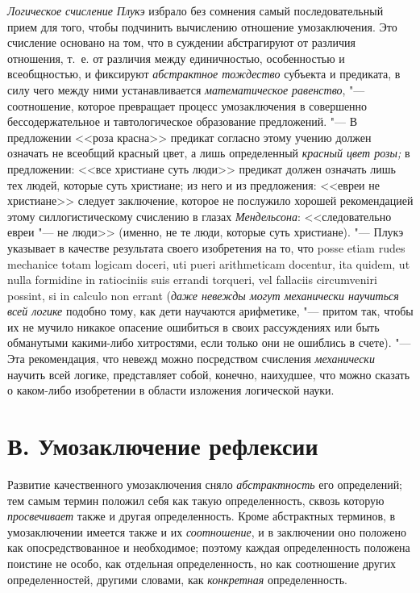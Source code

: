 {\em Логическое счисление Плукэ}
избрало без сомнения самый последовательный прием для того,
чтобы подчинить вычислению отношение умозаключения. Это счисление основано
на том, что в суждении абстрагируют от различия отношения, т.~е. от
различия между единичностью, особенностью и всеобщностью, и фиксируют
{\em абстрактное тождество}
субъекта и предиката, в силу чего между ними устанавливается
{\em математическое равенство}, "---
соотношение, которое превращает процесс умозаключения в
совершенно бессодержательное и тавтологическое образование предложений. "---
В предложении <<роза красна>> предикат согласно этому учению
должен означать не всеобщий красный цвет, а лишь определенный
{\em красный цвет розы;}
в предложении: <<все христиане суть люди>> предикат должен
означать лишь тех людей, которые суть христиане; из него и из предложения:
<<евреи не христиане>> следует заключение, которое не послужило хорошей
рекомендацией этому силлогистическому счислению в глазах
{\em Мендельсона}:
<<следовательно евреи "--- не люди>> (именно, не те
люди, которые суть христиане). "--- Плукэ указывает в качестве
результата своего изобретения на то, что posse etiam rudes mechanice totam
logicam doceri, uti pueri arithme\-ticam docentur, ita quidem, ut nulla
formidine in ratiociniis suis errandi torqueri, vel fallaciis circum\-veniri
possint, si in calculo non errant
({\em даже невежды могут механически
научиться всей логике} подобно тому, как дети научаются
арифметике, "--- притом так, чтобы их не мучило никакое
опасение ошибиться в своих рассуждениях или быть обманутыми какими-либо
хитростями, если только они не ошиблись в счете). "--- Эта
рекомендация, что невежд можно посредством счисления
{\em механически} научить
всей логике, представляет собой, конечно, наихудшее, что
можно сказать о каком-либо изобретении в области изложения логической
науки.

\section[В. Умозаключение рефлексии]{В. Умозаключение рефлексии}

Развитие качественного умозаключения сняло
{\em абстрактность} его
определений; тем самым термин положил себя как такую определенность, сквозь
которую {\em просвечивает}
также и другая определенность. Кроме абстрактных терминов, в
умозаключении имеется также и их
{\em соотношение}, и в
заключении оно положено как опосредствованное и необходимое; поэтому каждая
определенность положена поистине не особо, как отдельная определенность, но
как соотношение других определенностей, другими словами, как
{\em конкретная} определенность.

